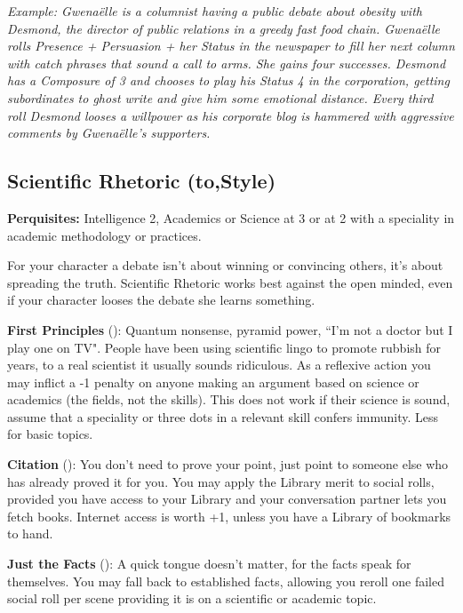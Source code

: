 \textit{Example: Gwena\"{e}lle is a columnist having a public debate about obesity with Desmond, the director of public relations in a greedy fast food chain. Gwena\"{e}lle rolls Presence + Persuasion + her Status in the newspaper to fill her next column with catch phrases that sound a call to arms. She gains four successes. Desmond has a Composure of 3 and chooses to play his Status 4 in the corporation, getting subordinates to ghost write and give him some emotional distance. Every third roll Desmond looses a willpower as his corporate blog is hammered with aggressive comments by Gwena\"{e}lle's supporters. }

\subsection*{Scientific Rhetoric (\textbullet\nobreak\hspace{.16667em}to\nobreak\hspace{.16667em}\textbullet\textbullet\textbullet\textbullet\textbullet,\nobreak\hspace{.16667em}Style)}

\textbf{Perquisites:} Intelligence 2, Academics or Science at 3 or at 2 with a speciality in academic methodology or practices.

For your character a debate isn't about winning or convincing others, it's about spreading the truth. Scientific Rhetoric works best against the open minded, even if your character looses the debate she learns something.

\textbf{First Principles} (\textbullet): Quantum nonsense, pyramid power, \textquotedblleft I'm not a doctor but I play one on TV". People have been using scientific lingo to promote rubbish for years, to a real scientist it usually sounds ridiculous. As a reflexive action you may inflict a -1 penalty on anyone making an argument based on science or academics (the fields, not the skills). This does not work if their science is sound, assume that a speciality or three dots in a relevant skill confers immunity. Less for basic topics.

\textbf{Citation} (\textbullet\textbullet): You don't need to prove your point, just point to someone else who has already proved it for you. You may apply the Library merit to social rolls, provided you have access to your Library and your conversation partner lets you fetch books. Internet access is worth +1, unless you have a Library of bookmarks to hand.

\textbf{Just the Facts} (\textbullet\textbullet\textbullet): A quick tongue doesn't matter, for the facts speak for themselves. You may fall back to established facts, allowing you reroll one failed social roll per scene providing it is on a scientific or academic topic.

